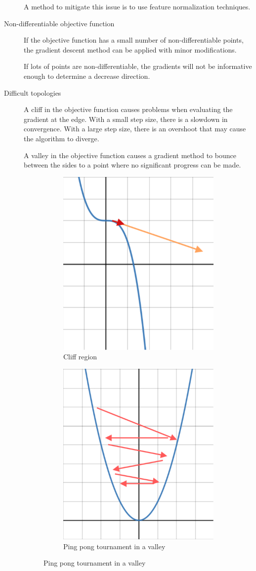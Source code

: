 \begin{description}
        A method to mitigate this issue is to use feature normalization techniques.

    \item[Non-differentiable objective function]
        If the objective function has a small number of non-differentiable points,
        the gradient descent method can be applied with minor modifications.
        
        If lots of points are non-differentiable, the gradients will not be informative enough 
        to determine a decrease direction.

    \item[Difficult topologies]
        A cliff in the objective function causes problems when evaluating the gradient at the edge.
        With a small step size, there is a slowdown in convergence. 
        With a large step size, there is an overshoot that may cause the algorithm to diverge.

        A valley in the objective function causes a gradient method to bounce between the sides
        to a point where no significant progress can be made.

        \begin{figure}[ht]
            \begin{subfigure}{.5\textwidth}
                \centering
                \includegraphics[width=.30\linewidth]{img/cliff.png}
                \caption{Cliff region}
            \end{subfigure}%
            \begin{subfigure}{.5\textwidth}
                \centering
                \includegraphics[width=.30\linewidth]{img/valley.png}
                \caption{Ping pong tournament in a valley}
            \end{subfigure}
        \end{figure}
\end{description}



